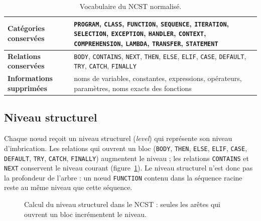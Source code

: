 {\begin{table}[htbp]
\centering
\small
\renewcommand{\arraystretch}{1.2}
\begin{tabularx}{\textwidth}{>{\bfseries}p{3.2cm}X}
\toprule
Catégories conservées &
\texttt{PROGRAM}, \texttt{CLASS}, \texttt{FUNCTION}, \texttt{SEQUENCE},
\texttt{ITERATION}, \texttt{SELECTION}, \texttt{EXCEPTION}, \texttt{HANDLER},
\texttt{CONTEXT}, \texttt{COMPREHENSION}, \texttt{LAMBDA}, \texttt{TRANSFER},
\texttt{STATEMENT} \\
\midrule
Relations conservées &
\texttt{BODY}, \texttt{CONTAINS}, \texttt{NEXT}, \texttt{THEN}, \texttt{ELSE},
\texttt{ELIF}, \texttt{CASE}, \texttt{DEFAULT}, \texttt{TRY}, \texttt{CATCH},
\texttt{FINALLY} \\
\midrule
Informations supprimées &
noms de variables, constantes, expressions, opérateurs, paramètres, noms
exacts des fonctions \\
\bottomrule
\end{tabularx}
\caption{Vocabulaire du NCST normalisé.}
\label{tab:ncst_vocab}
\end{table}

\subsection{Niveau structurel}

Chaque nœud reçoit un niveau structurel (\emph{level}) qui représente son
niveau d'imbrication. Les relations qui ouvrent un bloc (\texttt{BODY},
\texttt{THEN}, \texttt{ELSE}, \texttt{ELIF}, \texttt{CASE}, \texttt{DEFAULT},
\texttt{TRY}, \texttt{CATCH}, \texttt{FINALLY}) augmentent le niveau ; les
relations \texttt{CONTAINS} et \texttt{NEXT} conservent le niveau courant
(figure~\ref{fig:levels}). Le niveau structurel n'est donc pas la profondeur
de l'arbre : un nœud \texttt{FUNCTION} contenu dans la séquence racine reste
au même niveau que cette séquence.

\begin{figure}[htbp]
\centering
{}
\caption{Calcul du niveau structurel dans le NCST : seules les arêtes qui
ouvrent un bloc incrémentent le niveau.}
\label{fig:levels}
\end{figure}

}

